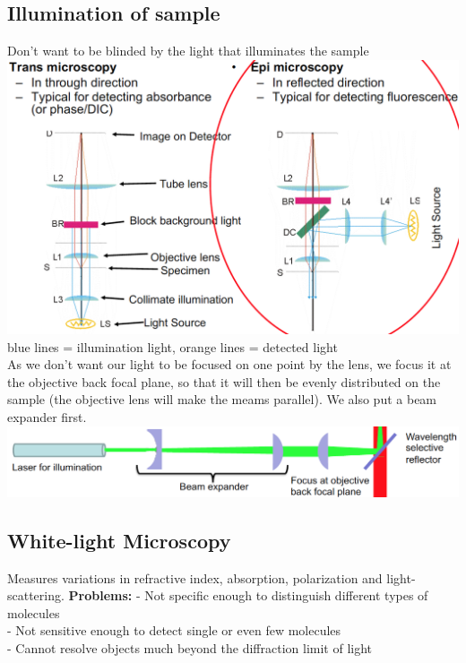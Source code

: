 \documentclass[9pt]{article}
\begin{document}
\begin{multicols}{2}
\subsection{Illumination of sample}
Don't want to be blinded by the light that illuminates the sample
\includegraphics[scale=0.2]{Images/illumination_of_sample.png} blue lines = illumination light, orange lines = detected light\\
As we don't want our light to be focused on one point by the lens, we focus it at the objective back focal plane, so that it will then be evenly distributed on the sample (the objective lens will make the meams parallel). We also put a beam expander first.\\
\includegraphics[scale=0.2]{Images/lightbeam_adaptations.png}
\subsection{White-light Microscopy}
Measures variations in refractive index, absorption, polarization and light-scattering. 
\textbf{Problems:} - Not specific enough to distinguish different types of molecules\\
- Not sensitive enough to detect single or even few molecules\\
- Cannot resolve objects much beyond the diffraction limit of light

\end{multicols}
\end{document}
